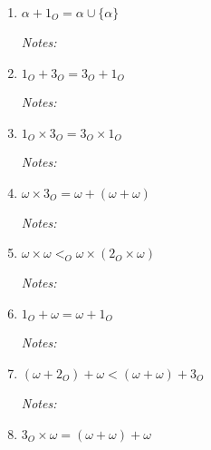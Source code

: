 \documentclass[justified]{tufte-handout}
\begin{document}
\begin{enumerate}[label=\roman*.]
\item $\alpha+1_O=\alpha\cup\{\alpha\}$

\noindent \emph{Notes:}  \underline{\hspace{15.4cm}}\\

\item $1_O+3_O=3_O+1_O$

\noindent \emph{Notes:}  \underline{\hspace{15.4cm}}\\

\item $1_O\times 3_O=3_O\times 1_O$

\noindent \emph{Notes:}  \underline{\hspace{15.4cm}}\\

\item $\omega\times 3_O=\omega+(\omega+\omega)$

\noindent \emph{Notes:}  \underline{\hspace{15.4cm}}\\

\item $\omega\times\omega<_O\omega\times(2_O\times\omega)$

\noindent \emph{Notes:}  \underline{\hspace{15.4cm}}\\

\item $1_O+\omega=\omega+1_O$

\noindent \emph{Notes:}  \underline{\hspace{15.4cm}}\\

\item $(\omega+2_O)+\omega<(\omega+\omega)+3_O$

\noindent \emph{Notes:}  \underline{\hspace{15.4cm}}\\

\item $3_O\times\omega=(\omega+\omega)+\omega$


\end{enumerate}
\end{document}
